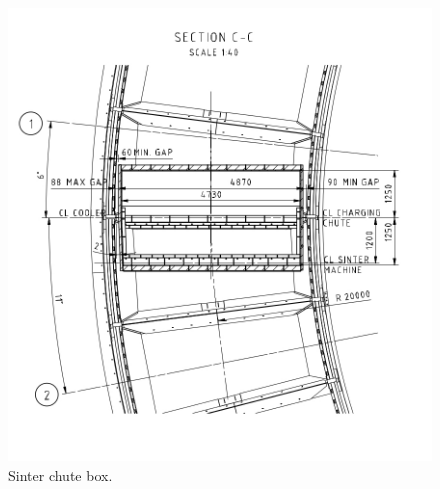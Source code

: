 \begin{figure}[!htb]
\centering
\includegraphics[width=.40\columnwidth]{images/056sinterChuteBox}
\caption[Sinter chute box]{Sinter chute box.}
\label{fig:056sinterChuteBox}
\end{figure}